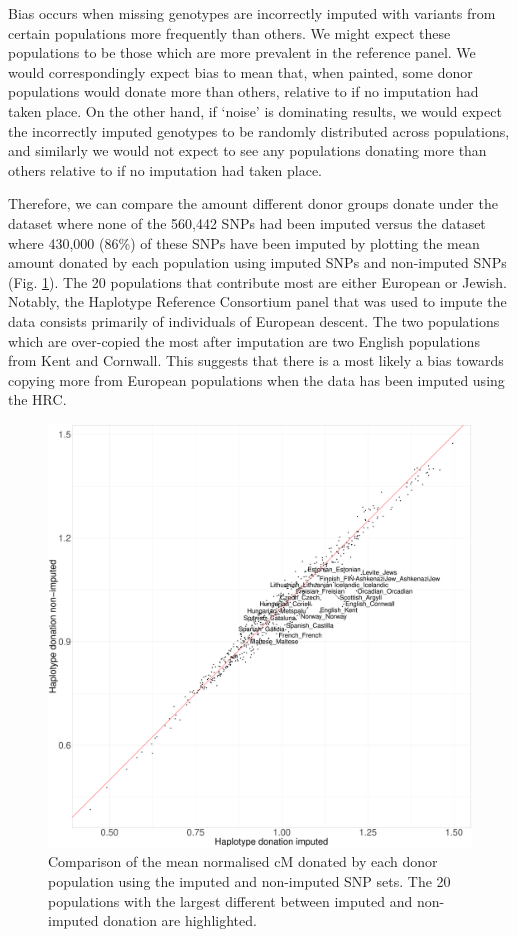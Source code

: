 Bias occurs when missing genotypes are incorrectly imputed with variants from certain populations more frequently than others. We might expect these populations to be those which are more prevalent in the reference panel. We would correspondingly expect bias to mean that, when painted, some donor populations would donate more than others, relative to if no imputation had taken place. On the other hand, if `noise' is dominating results, we would expect the incorrectly imputed genotypes to be randomly distributed across populations, and similarly we would not expect to see any populations donating more than others relative to if no imputation had taken place. 

Therefore, we can compare the amount different donor groups donate under the dataset where none of the 560,442 SNPs had been imputed versus the dataset where 430,000 (86\%) of these SNPs have been imputed by plotting the mean amount donated by each population using imputed SNPs and non-imputed SNPs (Fig. \ref{fig:imputed_nonimputed_donation}). The 20 populations that contribute most are either European or Jewish. Notably, the Haplotype Reference Consortium panel that was used to impute the data consists primarily of individuals of European descent. The two populations which are over-copied the most after imputation are two English populations from Kent and Cornwall. This suggests that there is a most likely a bias towards copying more from European populations when the data has been imputed using the HRC. 

\begin{figure}[htp]
    \centering
    \includegraphics[width=1.0\textwidth]{../images/chapter1/donation_imputed_nonimputed.pdf}
    \caption{Comparison of the mean normalised cM donated by each donor population using the imputed and non-imputed SNP sets. The 20 populations with the largest different between imputed and non-imputed donation are highlighted.}
    \label{fig:imputed_nonimputed_donation}
\end{figure}

